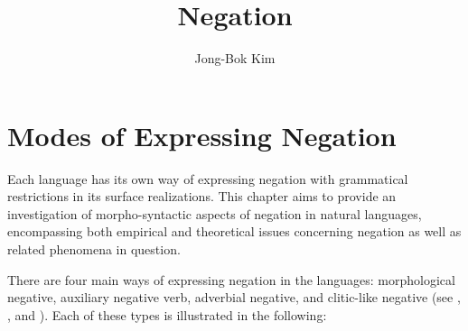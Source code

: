 \documentclass[output=paper]{langsci/langscibook}
\author{Jong-Bok Kim\affiliation{Kyung Hee University, Seoul}}
\title{Negation}
\begin{document}
\label{chap-negation}


\section{Modes of Expressing Negation}

Each language has its own way of expressing negation
with grammatical restrictions in its surface realizations.
This
chapter aims to provide an investigation of morpho-syntactic aspects
of negation in natural languages, encompassing both empirical and
theoretical issues  concerning negation as well as related phenomena
in question.


There are four main ways of expressing negation in the
languages: morphological negative,
auxiliary negative verb, adverbial negative, and clitic-like negative (see \citet{Dahl:79}, \citet{Payne:85}, and \citet{Dryer:05}).
Each of these types is illustrated in the following:
\end{document}
